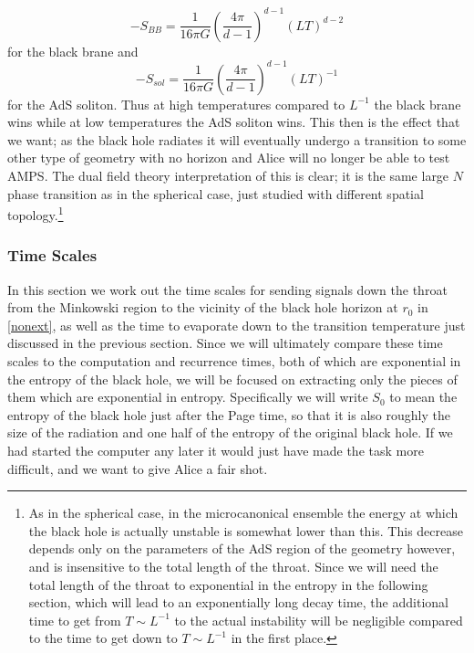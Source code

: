 \documentclass[12pt]{article}
\newcommand{\be}{\begin{equation}}
\newcommand{\ee}{\end{equation}}
\begin{document}
\be
-S_{BB}=\frac{1}{16\pi G}\left(\frac{4\pi}{d-1}\right)^{d-1} (LT)^{d-2}
\ee
for the black brane and 
\be
-S_{sol}=\frac{1}{16\pi G}\left(\frac{4\pi}{d-1}\right)^{d-1} \left(LT\right)^{-1}
\ee
for the AdS soliton.  Thus at high temperatures compared to $L^{-1}$ the black brane wins while at low temperatures the AdS soliton wins.  This then is the effect that we want; as the black hole radiates it will eventually undergo a transition to some other type of geometry with no horizon and Alice will no longer be able to test AMPS.  The dual field theory interpretation of this is clear; it is the same large $N$ phase transition as in the spherical case, just studied with different spatial topology.\footnote{As in the spherical case, in the microcanonical ensemble the energy at which the black hole is actually unstable is somewhat lower than this.  This decrease depends only on the parameters of the AdS region of the geometry however, and is insensitive to the total length of the throat.  Since we will need the total length of the throat to exponential in the entropy in the following section, which will lead to an exponentially long decay time, the additional time to get from $T\sim L^{-1}$ to the actual instability will be negligible compared to the time to get down to $T\sim L^{-1}$ in the first place.} 

\subsubsection{Time Scales}
In this section we work out the time scales for sending signals down the throat from the Minkowski region to the vicinity of the black hole horizon at $r_0$ in \eqref{nonext}, as well as the time to evaporate down to the transition temperature just discussed in the previous section.  Since we will ultimately compare these time scales to the computation and recurrence times, both of which are exponential in the entropy of the black hole, we will be focused on extracting only the pieces of them which are exponential in entropy.  Specifically we will write $S_0$ to mean the entropy of the black hole just after the Page time, so that it is also roughly the size of the radiation and one half of the entropy of the original black hole.  If we had started the computer any later it would just have made the task more difficult, and we want to give Alice a fair shot.  
\end{document}
